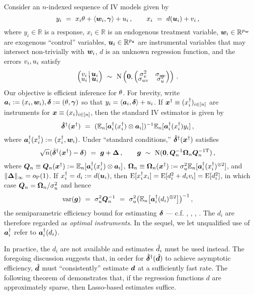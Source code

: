 \documentclass{uwstat572}
\newcommand{\be}{\begin{equation}}
\newcommand{\ee}{\end{equation}}
\newcommand{\benn}{\begin{equation*}}
\newcommand{\eenn}{\end{equation*}}
\theoremstyle{definition}
\theoremstyle{remark}
\newcommand{\R}{\ensuremath{\mathbb{R}}}
\newcommand{\Prb}{\mathrm{P}}
\newcommand{\E}{\mathrm{E}}
\newcommand{\En}{\mathbb{E}_n}
\newcommand{\Ex}{\mathbb{E}}
\newcommand{\Exn}{\Ex_n}
\newcommand{\var}{\mathrm{var}}
\newcommand{\Normal}{\mathrm{N}}
\newcommand{\bs}[1]{\boldsymbol{#1}}
\numberwithin{equation}{section}
\begin{document}
Consider an $n$-indexed sequence of IV models given by
\be\label{mod:iv}
	y_i \ = \ x_i\regt + \langle\w_i, \regg\rangle + \esi\,, \qquad x_i \ = \ d(\u_i) + \efi \,,
\ee
where $y_i \in \R$ is a response, $x_i \in \R$ is an endogenous treatment variable, $\w_i\in\R^{\pw}$ are exogenous ``control'' variables, $\u_i \in \R^{\pz}$ are instrumental variables that may intersect non-trivially with $\w_i$, $d$ is an unknown regression function, and the errors $v_i, u_i$ satisfy
\benn
	\begin{pmatrix} \efi \,|\, \u_i \\[-.5em] \esi \,|\, \u_i \end{pmatrix} \ \sim \ \Normal\left(\bs{0}, \begin{pmatrix} \sdf^2 & \sdfs \\[-.5em] \sdfs & \sds^2 \end{pmatrix} \right)\,.
\eenn
Our objective is efficient inference for $\theta$. For brevity, write $\a_i := (x_i, \w_i), \rd := (\regt, \regg)$ so that $y_i = \langle \a_i, \rd \rangle + \esi$. If $\xinst \equiv (\xinsti)_{i\inn}$ are instruments for $\x \equiv (x_i)_{i\inn}$, then the standard IV estimator is given by
\be\label{def:raiv}
	\rdiv(\xinst) \ = \ (\Exn[\ainsti(\xinsti) \kp \a_i])^{-1}\Exn[\ainsti(\xinsti) y_i] \,,
\ee
where $\ainst_i(\xinsti) := (\xinsti, \w_i)$. Under ``standard conditions,'' $\rdiv(\xinst)$ satisfies
\benn
	\sqrt{n}(\rdiv(\xinst) - \rd) \ = \ \g + \rm\,, \qquad \g \ \sim \ \Normal(\bs{0}, \Qn^{-1}\Omn\Qn^{-1\tp})\,,
\eenn
where $\Qn \equiv \Qn(\xinst) := \En[\ainst_i(\xinsti) \kp \a_i]$, $\Omn \equiv \Omn(\xinst) := \sds^2\En[\ainsti(\xinsti)^{\kpt}]$, and $\|\rm\|_\infty = o_{\Prb}(1)$. If $\xinsti = d_i := d(\u_i)$, then $\E[\xinsti x_i] = \E[d_i^2 + d_i\efi] = \E[d_i^2]$, in which case $\Qn = \Omn/\sds^2$ and hence
\benn
	\var(\g) \ = \ \sds^2\Qn^{-1} \ = \ \sds^2\big(\En\big[\ainsti(d_i)^{\kpt}\big]\big)^{-1} \,,
\eenn
the semiparametric efficiency bound for estimating $\rd$ --- c.f. \cite{BCCH12}, \cite{A74}, \cite{C87}, \cite{N90}. The $d_i$ are therefore regarded as \emph{optimal instruments}. In the sequel, we let unqualified use of $\ainsti$ refer to $\ainsti(d_i)$. 

In practice, the $d_i$ are not available and estimates $\hat{d}_i$ must be used instead. The foregoing discussion suggests that, in order for $\rdiv(\dhat)$ to achieve asymptotic efficiency, $\dhat$ must ``consistently'' estimate $\d$ at a sufficiently fast rate. The following theorem of \cite{BCH11} demonstrates that, if the regression functions $d$ are approximately sparse, then Lasso-based estimates suffice.
\end{document}
